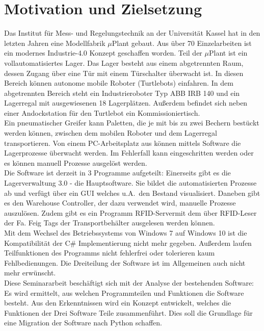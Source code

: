 ﻿%

\chapter{Motivation und Zielsetzung}

    Das Institut für Mess- und Regelungstechnik an der Universität Kassel hat in den letzten Jahren eine Modellfabrik $\mu$Plant gebaut.
    Aus über 70 Einzelarbeiten ist ein modernes Industrie-4.0 Konzept geschaffen worden.
    Teil der $\mu$Plant ist ein vollautomatisiertes Lager.
    Das Lager besteht aus einem abgetrennten Raum, dessen Zugang über eine Tür mit einem Türschalter überwacht ist.
    In diesen Bereich können autonome mobile Roboter (Turtlebots) einfahren.
    In dem abgetrennten Bereich steht ein Industrieroboter Typ ABB IRB 140 und ein Lagerregal mit ausgewiesenen 18 Lagerplätzen.
    Außerdem befindet sich neben einer Andockstation für den Turtlebot ein Kommissioniertisch. \\

    Ein pneumatischer Greifer kann Paletten, die je mit bis zu zwei Bechern bestückt werden können,
    zwischen dem mobilen Roboter und dem Lagerregal transportieren.
    Von einem PC-Arbeitsplatz aus können mittels Software die Lagerprozesse überwacht werden.
    Im Fehlerfall kann eingeschritten werden oder es können manuell Prozesse ausgelöst werden.\\

    Die Software ist derzeit in 3 Programme aufgeteilt: Einerseits gibt es die Lagerverwaltung 3.0 - die Hauptsoftware.
    Sie bildet die automatisierten Prozesse ab und verfügt über ein GUI welches u.A.\ den Bestand visualisiert.
    Daneben gibt es den Warehouse Controller, der dazu verwendet wird, manuelle Prozesse auszulösen.
    Zudem gibt es ein Programm \glqq RFID-Server\grqq mit dem über RFID-Leser der Fa. Feig Tags der Transportbehälter
    ausgelesen werden können.
    \\
    Mit dem Wechsel des Betriebssystems von Windows 7 auf Windows 10 ist die Kompatibilität der C\# Implementierung
    nicht mehr gegeben.
    Außerdem laufen Teilfunktionen des Programms nicht fehlerfrei oder tolerieren kaum Fehlbedienungen.
    Die Dreiteilung der Software ist im Allgemeinen auch nicht mehr erwünscht. \\

    Diese Seminararbeit beschäftigt sich mit der Analyse der bestehenden Software:
    Es wird ermittelt, aus welchen Programmteilen und Funktionen die Software besteht.
    Aus den Erkenntnissen wird ein Konzept entwickelt, welches die Funktionen der Drei Software Teile zusammenführt.
    Dies soll die Grundlage für eine Migration der Software nach Python schaffen.

